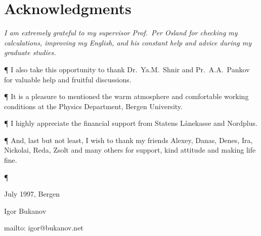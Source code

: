\chapter*{Acknowledgments}
{\sl
I am extremely grateful to my supervisor Prof.~Per Osland 
for checking my calculations, improving my English,
and his constant help and advice during my graduate studies.

\P
I also take this opportunity to thank Dr.~Ya.M.~Shnir and 
Pr.\ A.A.~Pankov for valuable help and fruitful discussions.
 
\P
It is a pleasure to mentioned the warm atmosphere and comfortable working
conditions at the Physics Department, Bergen University.
 
\P
I highly appreciate the financial support from Statens L{\aa}nekasse 
and Nordplus.
 
\P
And, last but not least, I wish to thank my friends
Alexey, Danas, Denes, Ira, Nickolai, Reda, Zsolt and many others for support, 
kind attitude and making life fine.

\P
\vspace*{0cm}
\begin{flushright}
July 1997, Bergen
\end{flushright}
Igor Bukanov
 
{\scriptsize
\newline
mailto: igor@bukanov.net
}
}
